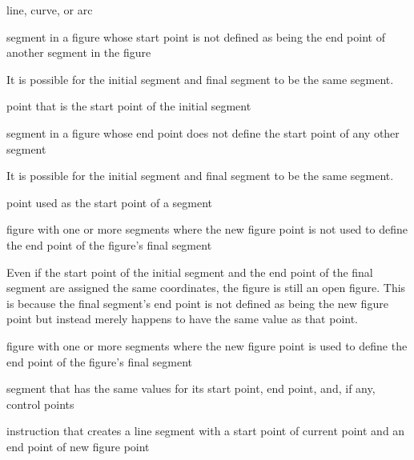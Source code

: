 %
line, \bezierlocal curve, or arc

%
segment in a figure whose start point is not defined as being the end point of another segment in the figure
\begin{note}
It is possible for the initial segment and final segment to be the same segment.
\end{note}

%
point that is the start point of the initial segment

%
segment in a figure whose end point does not define the start point of any other segment
\begin{note}
It is possible for the initial segment and final segment to be the same segment.
\end{note}

%
point used as the start point of a segment

%
figure with one or more segments where the new figure point is not used to define the end point of the figure's final segment
\begin{note}
Even if the start point of the initial segment and the end point of the final segment are assigned the same coordinates, the figure is still an open figure. This is because the final segment's end point is not defined as being the new figure point but instead merely happens to have the same value as that point.
\end{note}

%
figure with one or more segments where the new figure point is used to define the end point of the figure's final segment

%
segment that has the same values for its start point, end point, and, if any, control points

%
 instruction that creates a line segment with a start point of current point and an end point of new figure point


